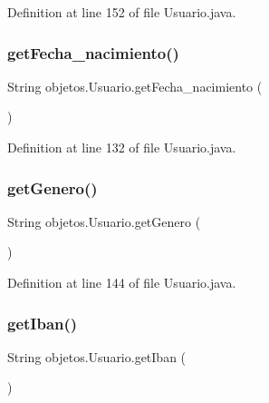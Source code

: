 Definition at line 152 of file Usuario.\+java.

\mbox{\label{classobjetos_1_1_usuario_a175efa1135100c4750a19be789391307}} 
\subsubsection{\texorpdfstring{get\+Fecha\+\_\+nacimiento()}{getFecha\_nacimiento()}}
{\footnotesize\ttfamily String objetos.\+Usuario.\+get\+Fecha\+\_\+nacimiento (\begin{DoxyParamCaption}{ }\end{DoxyParamCaption})}



Definition at line 132 of file Usuario.\+java.

\mbox{\label{classobjetos_1_1_usuario_ad91ec5ebca29f02270f825af722dd285}} 
\subsubsection{\texorpdfstring{get\+Genero()}{getGenero()}}
{\footnotesize\ttfamily String objetos.\+Usuario.\+get\+Genero (\begin{DoxyParamCaption}{ }\end{DoxyParamCaption})}



Definition at line 144 of file Usuario.\+java.

\mbox{\label{classobjetos_1_1_usuario_ab66729eaad2e417c447f8b86bb56c986}} 
\subsubsection{\texorpdfstring{get\+Iban()}{getIban()}}
{\footnotesize\ttfamily String objetos.\+Usuario.\+get\+Iban (\begin{DoxyParamCaption}{ }\end{DoxyParamCaption})}



